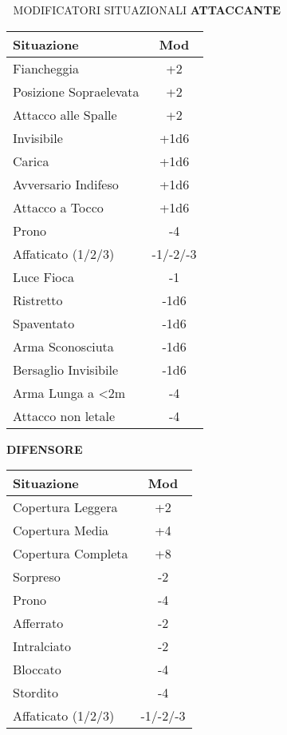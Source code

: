 \documentclass[10pt,a4paper,landscape]{article}
\begin{document}
\begin{multicols}{4}
		\begin{mainsection}{🎲 MODIFICATORI SITUAZIONALI}
			\textbf{ATTACCANTE}
			\begin{tabular}{@{}p{3.5cm}c@{}}
				\toprule
				\textbf{Situazione} & \textbf{Mod} \\
				\midrule
				Fiancheggia & +2 \\
				Posizione Sopraelevata & +2 \\
				Attacco alle Spalle & +2 \\
				Invisibile & +1d6 \\
				Carica & +1d6 \\
				Avversario Indifeso & +1d6 \\
				Attacco a Tocco & +1d6 \\
				\midrule
				Prono & -4 \\
				Affaticato (1/2/3) & -1/-2/-3 \\
				Luce Fioca & -1 \\
				Ristretto & -1d6 \\
				Spaventato & -1d6 \\
				Arma Sconosciuta & -1d6 \\
				Bersaglio Invisibile & -1d6 \\
				Arma Lunga a <2m & -4 \\
				Attacco non letale & -4 \\
				\bottomrule
			\end{tabular}
			
			\vspace{2mm}
			
			\textbf{DIFENSORE}
			\begin{tabular}{@{}p{3.5cm}c@{}}
				\toprule
				\textbf{Situazione} & \textbf{Mod} \\
				\midrule
				Copertura Leggera & +2 \\
				Copertura Media & +4 \\
				Copertura Completa & +8 \\
				\midrule
				Sorpreso & -2 \\
				Prono & -4 \\
				Afferrato & -2 \\
				Intralciato & -2 \\
				Bloccato & -4 \\
				Stordito & -4 \\
				Affaticato (1/2/3) & -1/-2/-3 \\
				\bottomrule
			\end{tabular}
		\end{mainsection}
		

\end{multicols}
\end{document}
